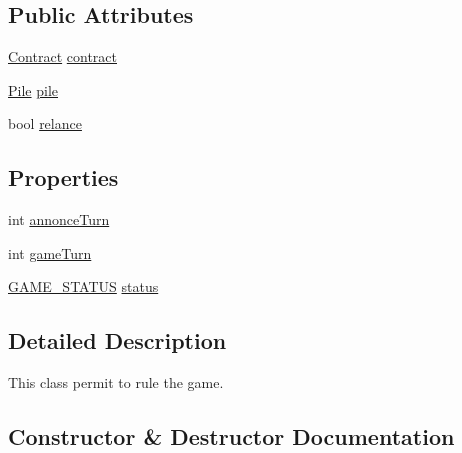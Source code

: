 \subsection*{Public Attributes}
\begin{DoxyCompactItemize}
\item 
\hyperlink{class_game_1_1_contract}{Contract} \hyperlink{class_server_1_1_game_manager_af24c716c34949ff495b9a47eec59d88c}{contract}
\item 
\hyperlink{class_game_1_1_pile}{Pile} \hyperlink{class_server_1_1_game_manager_a4aa559ff09ed2f8a2cdcc057ef1173ea}{pile}
\item 
bool \hyperlink{class_server_1_1_game_manager_a33a61dc395239feaf64a60e508831f25}{relance}
\end{DoxyCompactItemize}
\subsection*{Properties}
\begin{DoxyCompactItemize}
\item 
int \hyperlink{class_server_1_1_game_manager_a72cab963cde1a3e7445f3d2fb44d3ee9}{annonce\+Turn}
\item 
int \hyperlink{class_server_1_1_game_manager_a8e96395c8c7e183856fff1cb92ae948f}{game\+Turn}
\item 
\hyperlink{namespace_server_a2b496a25969b5c46d373f7079fac645f}{G\+A\+M\+E\+\_\+\+S\+T\+A\+T\+US} \hyperlink{class_server_1_1_game_manager_a987a6f902c77f26b829ef23b7cdd1254}{status}
\end{DoxyCompactItemize}


\subsection{Detailed Description}
This class permit to rule the game. 

\subsection{Constructor \& Destructor Documentation}
\mbox{\label{class_server_1_1_game_manager_af92b9cb93c22d1751486c11c7f49a26f}} 
